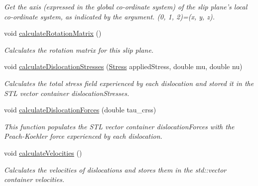 \begin{DoxyCompactItemize}
\begin{DoxyCompactList}\small\item\em Get the axis (expressed in the global co-\/ordinate system) of the slip plane's local co-\/ordinate system, as indicated by the argument. (0, 1, 2)=(x, y, z). \end{DoxyCompactList}\item 
void \hyperlink{classSlipPlane_a5d9054f21be225f50860ad1351e3a86f}{calculate\-Rotation\-Matrix} ()
\begin{DoxyCompactList}\small\item\em Calculates the rotation matrix for this slip plane. \end{DoxyCompactList}\item 
void \hyperlink{classSlipPlane_a2d4d2d031502d4a6f0aebbad0990b882}{calculate\-Dislocation\-Stresses} (\hyperlink{classStress}{Stress} applied\-Stress, double mu, double nu)
\begin{DoxyCompactList}\small\item\em Calculates the total stress field experienced by each dislocation and stored it in the S\-T\-L vector container dislocation\-Stresses. \end{DoxyCompactList}\item 
void \hyperlink{classSlipPlane_ac16d1abbbc3b938b6f1f29a33a70212d}{calculate\-Dislocation\-Forces} (double tau\-\_\-crss)
\begin{DoxyCompactList}\small\item\em This function populates the S\-T\-L vector container dislocation\-Forces with the Peach-\/\-Koehler force experienced by each dislocation. \end{DoxyCompactList}\item 
void \hyperlink{classSlipPlane_aa954f3ded4b3cc9fa8fd1f70ac9f8516}{calculate\-Velocities} ()
\begin{DoxyCompactList}\small\item\em Calculates the velocities of dislocations and stores them in the std\-::vector container velocities. \end{DoxyCompactList}\end{DoxyCompactItemize}
